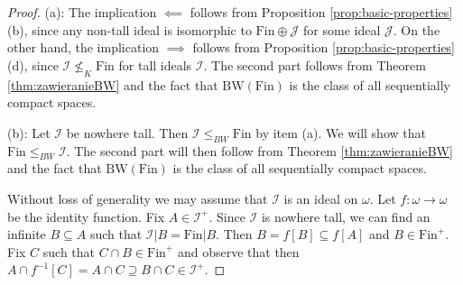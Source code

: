 \documentclass[10pt,a4paper]{amsart}
\newcommand{\BW}{\mathrm{BW}}
\newcommand{\Fin}{\mathrm{Fin}}
\newcommand{\I}{\cI}
\newcommand{\J}{\cJ}
\newcommand{\cI}{\mathcal{I}}
\newcommand{\cJ}{\mathcal{J}}
\newcommand{\fin}{\mathrm{Fin}}
\begin{document}
\begin{proof}
(a): The implication $\impliedby$ follows from Proposition \ref{prop:basic-properties}(b), since any non-tall ideal is isomorphic to $\Fin\oplus\J$ for some ideal $\J$. On the other hand, the implication $\implies$ follows from Proposition \ref{prop:basic-properties}(d), since $\I\not\leq_K\Fin$ for tall ideals $\I$. The second part follows from Theorem \ref{thm:zawieranieBW} and the fact that $\BW(\Fin)$ is the class of all sequentially compact spaces.

(b): Let $\I$ be nowhere tall. Then $\I\leq_{BW}\Fin$ by item (a). We will show that $\Fin\leq_{BW}\I$. The second part will then follow from Theorem \ref{thm:zawieranieBW} and the fact that $\BW(\Fin)$ is the class of all sequentially compact spaces.

Without loss of generality we may assume that $\I$ is an ideal on $\omega$. Let $f:\omega \to \omega$ be the identity function. Fix $A \in \I^+$. Since $\I$ is nowhere tall, we can find an infinite $B\subseteq A$ such that $\I|B=\Fin|B$. Then $B = f[B]\subseteq f[A]$ and $B \in \fin^+$. Fix $C$ such that $C\cap B \in \fin^+$ and observe that then $A \cap f^{-1}[C]=A \cap C \supseteq B\cap C\in \I^+$.
\end{proof}
\end{document}
